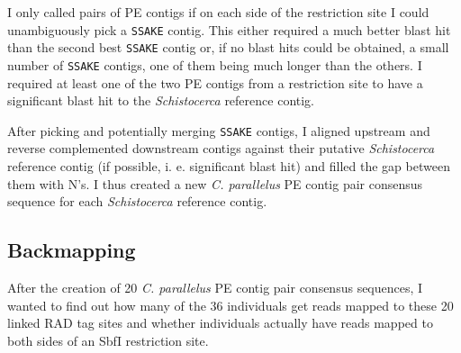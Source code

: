\documentclass[a4paper,12pt,times,authoryear,twoside,print,index]{Classes/PhDThesisPSnPDF}\usepackage[]{graphicx}\usepackage[]{color}
\begin{document}
I only called pairs of PE contigs if on each side of the restriction site I could unambiguously pick a \texttt{SSAKE} contig. This either required a much better blast hit than the second best \texttt{SSAKE} contig or, if no blast hits could be obtained, a small number of \texttt{SSAKE} contigs, one of them being much longer than the others. I required at least one of the two PE contigs from a restriction site to have a significant blast hit to the \textit{Schistocerca} reference contig.

After picking and potentially merging \texttt{SSAKE} contigs, I aligned upstream and reverse complemented downstream contigs against their putative \textit{Schistocerca} reference contig (if possible, i. e. significant blast hit) and filled the gap between them with N's. I thus created a new \textit{C. parallelus} PE contig pair consensus sequence for each \textit{Schistocerca} reference contig. 

\FloatBarrier
\subsection{Backmapping}\label{ch:Backmapping}

After the creation of 20 \textit{C. parallelus} PE contig pair consensus sequences, I wanted to find out how many of the 36 individuals get reads mapped to these 20 \glspl{linked RAD tag site} and whether individuals actually have reads mapped to both sides of an SbfI restriction site. 
\end{document}
